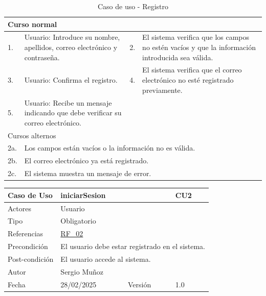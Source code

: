 \begin{table}[H]
	\centering
	\begin{tabular}{| m{} | m{} | m{} | m{} |}
		\hline
		\multicolumn{4}{|m{0.9\textwidth}|}{Curso normal}     \\ 
		\hline
		1. & Usuario: Introduce su nombre, apellidos, correo electrónico y contraseña. 
        & 2. & El sistema verifica que los campos no estén vacíos y que la información introducida sea válida. \\ 
		\hline
		3. & Usuario: Confirma el registro. & 4. & El sistema verifica que el correo electrónico no esté registrado previamente.   \\ 
		\hline
        5. & Usuario: Recibe un mensaje indicando que debe verificar su correo electrónico. &  &  \\ 
        \hline
		\multicolumn{4}{|m{0.9\textwidth}|}{Cursos alternos}     \\
        \hline 
        2a. & \multicolumn{3}{l|}{Los campos están vacíos o la información no es válida.} \\ 
        \hline
        2b. & \multicolumn{3}{l|}{El correo electrónico ya está registrado.} \\ 
        \hline
        2c. & \multicolumn{3}{l|}{El sistema muestra un mensaje de error.} \\ 
        \hline
	\end{tabular}
	\caption{Caso de uso - Registro}
\end{table}

\newpage

\begin{table}[H]
    \centering
    \begin{tabular}{| m{} | m{} | m{} | m{} |}
        \hline
        \rowcolor[HTML]{C0C0C0} Caso de Uso & \multicolumn{2}{|m{0.43\textwidth}|}{iniciarSesion} &  CU2\\ 
        \hline
        Actores & \multicolumn{3}{l|}{Usuario} \\ 
        \hline
        Tipo & \multicolumn{3}{l|}{Obligatorio} \\ 
        \hline
        Referencias & \multicolumn{3}{l|}{\hyperref[req:RF02]{RF\_02}} \\ 
        \hline
        Precondición & \multicolumn{3}{l|}{El usuario debe estar registrado en el sistema.} \\ 
        \hline
        Post-condición & \multicolumn{3}{l|}{El usuario accede al sistema.} \\ 
        \hline
        Autor & \multicolumn{3}{l|}{Sergio Muñoz} \\ 
        \hline
        Fecha & 28/02/2025 & Versión & 1.0 \\
        \hline
    \end{tabular}
\end{table}

